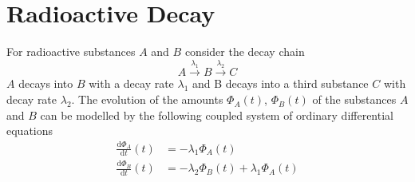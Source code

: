 \documentclass{article}
\begin{document}
\section*{Radioactive Decay}
For radioactive substances $A$ and $B$ consider the decay chain
\begin{equation*}
    A \overset{\lambda_{1}}{\longrightarrow} B \overset{\lambda_{2}}{\longrightarrow} C
\end{equation*}
$A$ decays into $B$ with a decay rate $\lambda_{1}$ and B decays into a third substance $C$ with decay rate $\lambda_{2}$. The evolution of the amounts $\Phi_{A}\left(t\right)$, $\Phi_{B}\left(t\right)$ of the substances $A$ and $B$ can be modelled by the following coupled system of ordinary differential equations
\begin{align}
    \frac{\mathrm{d}\Phi_{A}}{\mathrm{d} t}\left(t\right) &= -\lambda_{1}\Phi_{A}\left(t\right) \\
    \frac{\mathrm{d}\Phi_{B}}{\mathrm{d} t}\left(t\right) &= -\lambda_{2}\Phi_{B}\left(t\right) + \lambda_{1}\Phi_{A}\left(t\right)
\end{align}
\end{document}
